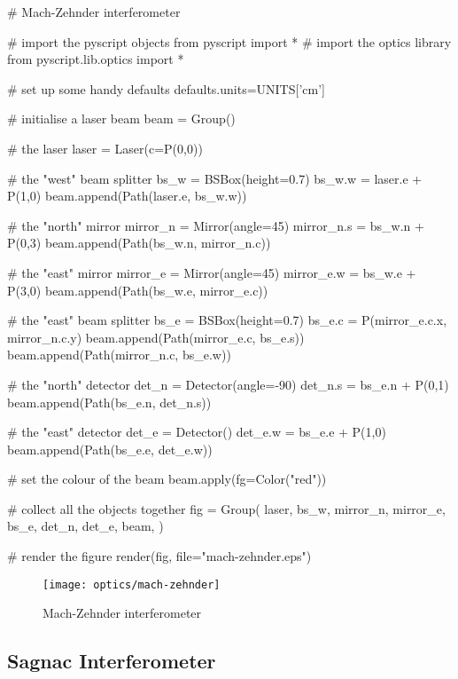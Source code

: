 \begin{python}
# Mach-Zehnder interferometer

# import the pyscript objects
from pyscript import *
# import the optics library
from pyscript.lib.optics import *

# set up some handy defaults
defaults.units=UNITS['cm']

# initialise a laser beam
beam = Group()

# the laser
laser = Laser(c=P(0,0))

# the "west" beam splitter
bs_w = BSBox(height=0.7)
bs_w.w = laser.e + P(1,0)
beam.append(Path(laser.e, bs_w.w))

# the "north" mirror
mirror_n = Mirror(angle=45)
mirror_n.s = bs_w.n + P(0,3)
beam.append(Path(bs_w.n, mirror_n.c))

# the "east" mirror
mirror_e = Mirror(angle=45)
mirror_e.w = bs_w.e + P(3,0)
beam.append(Path(bs_w.e, mirror_e.c))

# the "east" beam splitter
bs_e = BSBox(height=0.7)
bs_e.c = P(mirror_e.c.x, mirror_n.c.y)
beam.append(Path(mirror_e.c, bs_e.s))
beam.append(Path(mirror_n.c, bs_e.w))

# the "north" detector
det_n = Detector(angle=-90)
det_n.s = bs_e.n + P(0,1)
beam.append(Path(bs_e.n, det_n.s))

# the "east" detector
det_e = Detector()
det_e.w = bs_e.e + P(1,0)
beam.append(Path(bs_e.e, det_e.w))

# set the colour of the beam
beam.apply(fg=Color("red"))

# collect all the objects together
fig = Group(
        laser,
        bs_w,
        mirror_n, mirror_e,
        bs_e,
        det_n, det_e,
        beam,
        )

# render the figure
render(fig,
        file="mach-zehnder.eps")
\end{python}

\begin{figure}[ht]
\centerline{\texttt{[image: optics/mach-zehnder]}}
\caption{Mach-Zehnder interferometer}
\label{fig:mach-zehnder}
\end{figure}

\subsection{Sagnac Interferometer}

